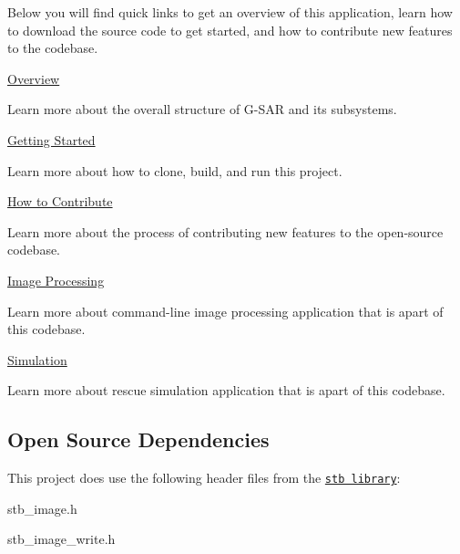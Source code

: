 Below you will find quick links to get an overview of this application, learn how to download the source code to get started, and how to contribute new features to the codebase.
\begin{DoxyEnumerate}
\item \hyperlink{overview}{Overview}
\begin{DoxyItemize}
\item Learn more about the overall structure of G-\/\+S\+AR and its subsystems.
\end{DoxyItemize}
\item \hyperlink{getting-started}{Getting Started}
\begin{DoxyItemize}
\item Learn more about how to clone, build, and run this project.
\end{DoxyItemize}
\item \hyperlink{contributing}{How to Contribute}
\begin{DoxyItemize}
\item Learn more about the process of contributing new features to the open-\/source codebase.
\end{DoxyItemize}
\item \hyperlink{image-processing}{Image Processing}
\begin{DoxyItemize}
\item Learn more about command-\/line image processing application that is apart of this codebase.
\end{DoxyItemize}
\item \hyperlink{simulation}{Simulation}
\begin{DoxyItemize}
\item Learn more about rescue simulation application that is apart of this codebase.
\end{DoxyItemize}
\end{DoxyEnumerate}

\subsection*{Open Source Dependencies}

This project does use the following header files from the \href{https://github.com/nothings/stb}{\tt stb library}\+:
\begin{DoxyItemize}
\item stb\+\_\+image.\+h
\item stb\+\_\+image\+\_\+write.\+h
\end{DoxyItemize}

